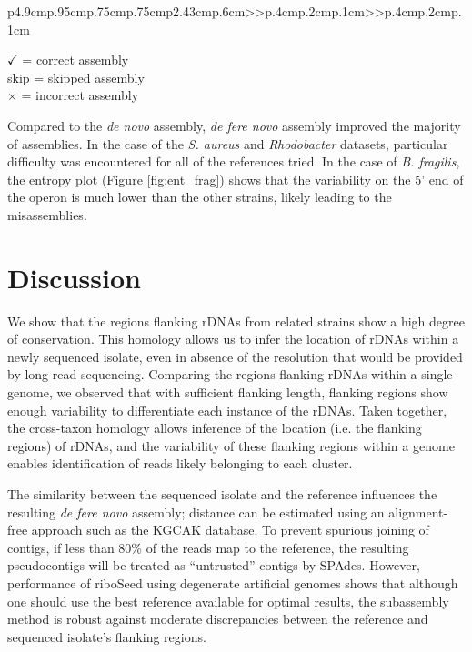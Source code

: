 \documentclass[10pt]{article}
\begin{document}
\begin{linenumbers}
\begin{table}[]
{\begin{tabular}{p{4.9cm}p{.95cm}p{.75cm}p{.75cm}p{2.43cm}p{.6cm}>{\color{black}}>{\hfill}p{.4cm}p{.2cm}p{.1cm}>{\color{black}}>{\hfill}p{.4cm}p{.2cm}p{.1cm}}
    \bottomrule
    \begin{minipage}[t]{.5\textwidth}
      {\tiny
        $\checkmark$ = correct assembly \\ skip = skipped assembly \\ $\times$ = incorrect assembly
      }
    \end{minipage}
  \end{tabular}
  }
\end{table}

Compared to the \textit{de novo} assembly, \textit{de fere novo} assembly improved the majority of assemblies. In the case of the \textit{S. aureus} and \textit{Rhodobacter} datasets, particular difficulty was encountered for all of the references tried. In the case of \textit{B. fragilis}, the entropy plot (Figure \ref{fig:ent_frag}) shows that the variability on the 5' end of the operon is much lower than the other strains, likely leading to the misassemblies.


\section*{Discussion}
We show that the regions flanking rDNAs from related strains show a high degree of conservation. This homology allows us to infer the location of rDNAs within a newly sequenced isolate, even in absence of the resolution that would be provided by long read sequencing. Comparing the regions flanking rDNAs within a single genome, we observed that with sufficient flanking length, flanking regions show enough variability to differentiate each instance of the rDNAs. Taken together, the cross-taxon homology allows inference of the location (i.e. the flanking regions) of rDNAs, and the variability of these flanking regions within a genome enables identification of reads likely belonging to each cluster.


The similarity between the sequenced isolate and the reference influences the resulting \textit{de fere novo} assembly; distance can be estimated using an alignment-free approach such as the KGCAK database\cite{Wang2015b}. To prevent spurious joining of contigs, if less than 80\% of the reads map to the reference, the resulting pseudocontigs will be treated as ``untrusted'' contigs by SPAdes. However, performance of riboSeed using degenerate artificial genomes shows that although one should use the best reference available for optimal results, the subassembly method is robust against moderate discrepancies between the reference and sequenced isolate's flanking regions.




\end{linenumbers}
\end{document}
